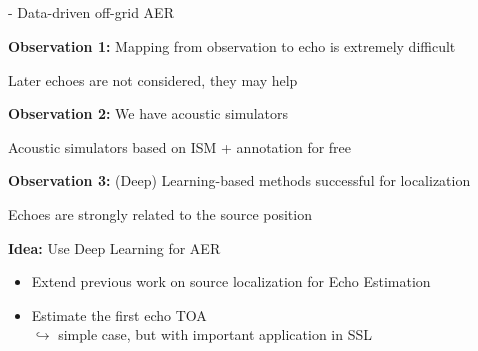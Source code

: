 





\subsection{\lantern}

\begin{frame}{\lantern - Data-driven off-grid AER}

    \begin{block}{\textbf{Observation 1:} Mapping from observation to echo is extremely difficult}

        \vspace{.1em}
        Later echoes are not considered, they may help
    \end{block}
    \pause

    \begin{block}{\textbf{Observation 2:} We have acoustic simulators}

        \vspace{.1em}
        Acoustic simulators based on ISM + annotation for free
    \end{block}
    \pause

    \begin{block}{\textbf{Observation 3:} (Deep) Learning-based methods successful for localization}

        \vspace{.1em}
        Echoes are strongly related to the source position
    \end{block}
    \pause

    \begin{alertblock}{\textbf{Idea:} Use Deep Learning for AER}
        \begin{itemize}
            \item Extend previous work on source localization for Echo Estimation
            \item Estimate the first echo TOA
            \\$\hookrightarrow$ simple case, but with important application in SSL
        \end{itemize}
    \end{alertblock}

\end{frame}

